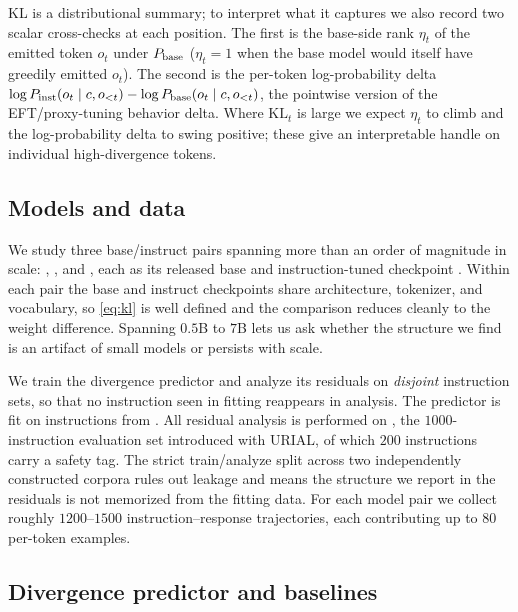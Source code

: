  KL is a distributional summary; to interpret what it captures we also record two scalar cross-checks at each position. The first is the base-side rank $\eta_t$ of the emitted token $o_t$ under $P_{\mathrm{base}}$ ($\eta_t=1$ when the base model would itself have greedily emitted $o_t$). The second is the per-token log-probability delta $\log P_{\mathrm{inst}}(o_t\mid c,o_{<t}) - \log P_{\mathrm{base}}(o_t\mid c,o_{<t})$, the pointwise version of the EFT/proxy-tuning behavior delta. Where $\mathrm{KL}_t$ is large we expect $\eta_t$ to climb and the log-probability delta to swing positive; these give an interpretable handle on individual high-divergence tokens.

\subsection{Models and data}\label{ssec:data}

 We study three \qwen base/instruct pairs spanning more than an order of magnitude in scale: \qwensmall, \qwenmid, and \qwenbig, each as its released base and instruction-tuned checkpoint \citep{qwen2025}. Within each pair the base and instruct checkpoints share architecture, tokenizer, and vocabulary, so \eqref{eq:kl} is well defined and the comparison reduces cleanly to the weight difference. Spanning $0.5$B to $7$B lets us ask whether the structure we find is an artifact of small models or persists with scale.

 We train the divergence predictor and analyze its residuals on \emph{disjoint} instruction sets, so that no instruction seen in fitting reappears in analysis. The predictor is fit on instructions from \dolly \citep{dolly2023}. All residual analysis is performed on \justeval \citep{lin2023urial}, the $1000$-instruction evaluation set introduced with URIAL, of which $200$ instructions carry a safety tag. The strict train/analyze split across two independently constructed corpora rules out leakage and means the structure we report in the residuals is not memorized from the fitting data. For each model pair we collect roughly $1200$--$1500$ instruction--response trajectories, each contributing up to $80$ per-token examples.

\subsection{Divergence predictor and baselines}\label{ssec:predictor}


